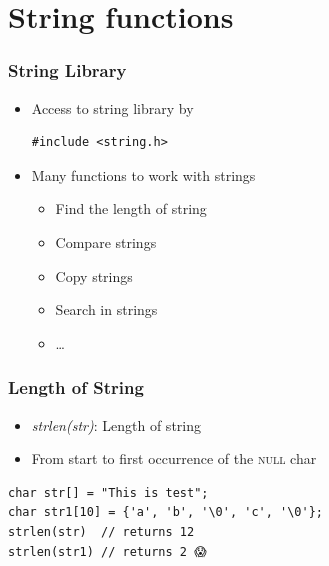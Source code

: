\documentclass{../c-lecture}
\begin{document}
\section{String functions}

\begin{frame}[fragile]
  \frametitle{String Library}
  \begin{itemize}
    \item Access to string library by
    \begin{verbatim}
#include <string.h>
    \end{verbatim}
    \item Many functions to work with strings
    \begin{itemize}
      \item Find the length of string
      \item Compare strings
      \item Copy strings
      \item Search in strings
      \item \ldots
    \end{itemize}
  \end{itemize}
\end{frame}

\begin{frame}[fragile]
  \frametitle{Length of String}
  \begin{itemize}
    \item \textit{\color{YellowOrange} strlen(str)}: Length of string
    \item
      From start to first occurrence of the
      \textsc{\color{LimeGreen} null} char

  \end{itemize}
  \begin{verbatim}
char str[] = "This is test";
char str1[10] = {'a', 'b', '\0', 'c', '\0'};
strlen(str)  // returns 12
strlen(str1) // returns 2 😱
  \end{verbatim}
\end{frame}
\end{document}
